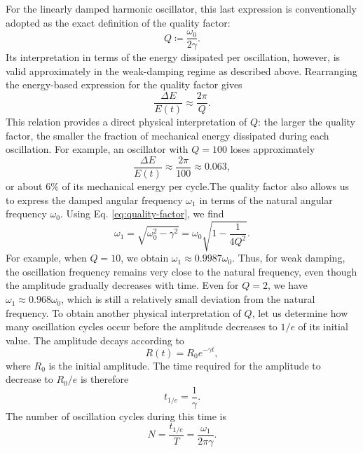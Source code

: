 \documentclass[12pt]{article}
\begin{document}
For the linearly damped harmonic oscillator, this last expression is conventionally adopted as the exact definition of the quality factor:
\begin{equation}
    Q\coloneqq\frac{\omega_0}{2\gamma}.
    \label{eq:quality-factor}
\end{equation}
Its interpretation in terms of the energy dissipated per oscillation, however, is valid approximately in the weak-damping regime as described above. Rearranging the energy-based expression for the quality factor gives
\begin{equation}
    \frac{\Delta E}{E(t)}
    \approx\frac{2\pi}{Q}.
\end{equation}
This relation provides a direct physical interpretation
of $Q$: the larger the quality factor, the smaller
the fraction of mechanical energy dissipated during
each oscillation. For example, an oscillator with
$Q=100$ loses approximately
\begin{equation}
    \frac{\Delta E}{E(t)}
    \approx\frac{2\pi}{100}\approx 0.063,
\end{equation}
or about $6\%$ of its mechanical energy per cycle.The quality factor also allows us to express the damped angular frequency $\omega_1$ in terms of the natural angular frequency $\omega_0$. Using Eq. \eqref{eq:quality-factor}, we find
\begin{equation}
    \omega_1=\sqrt{\omega_0^2-\gamma^2}
    =\omega_0\sqrt{1-\frac{1}{4Q^2}}.
\end{equation}
For example, when $Q=10$, we obtain $\omega_1\approx0.9987\omega_0$. Thus, for weak damping, the oscillation frequency remains very close to the natural frequency, even though the amplitude gradually decreases with time. Even for $Q=2$, we have $\omega_1\approx0.968\omega_0$, which is still a relatively small deviation from the natural frequency. To obtain another physical interpretation of $Q$, let us determine how many oscillation cycles occur before the amplitude decreases to $1/e$ of its initial value. The amplitude decays according to
\begin{equation}
    R(t)=R_0e^{-\gamma t},
\end{equation}
where $R_0$ is the initial amplitude. The time required for the amplitude to decrease to $R_0/e$ is therefore
\begin{equation}
    t_{1/e}=\frac{1}{\gamma}.
\end{equation}
The number of oscillation cycles during this time is
\begin{equation}
    N=\frac{t_{1/e}}{T}
    =\frac{\omega_1}{2\pi\gamma}.
\end{equation}
\end{document}
